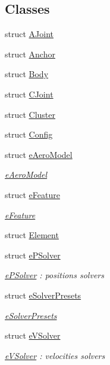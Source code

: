 \subsection*{Classes}
\begin{DoxyCompactItemize}
\item 
struct \hyperlink{structbtSoftBody_1_1AJoint}{A\+Joint}
\item 
struct \hyperlink{structbtSoftBody_1_1Anchor}{Anchor}
\item 
struct \hyperlink{structbtSoftBody_1_1Body}{Body}
\item 
struct \hyperlink{structbtSoftBody_1_1CJoint}{C\+Joint}
\item 
struct \hyperlink{structbtSoftBody_1_1Cluster}{Cluster}
\item 
struct \hyperlink{structbtSoftBody_1_1Config}{Config}
\item 
struct \hyperlink{structbtSoftBody_1_1eAeroModel}{e\+Aero\+Model}
\begin{DoxyCompactList}\small\item\em \hyperlink{structbtSoftBody_1_1eAeroModel}{e\+Aero\+Model} \end{DoxyCompactList}\item 
struct \hyperlink{structbtSoftBody_1_1eFeature}{e\+Feature}
\begin{DoxyCompactList}\small\item\em \hyperlink{structbtSoftBody_1_1eFeature}{e\+Feature} \end{DoxyCompactList}\item 
struct \hyperlink{structbtSoftBody_1_1Element}{Element}
\item 
struct \hyperlink{structbtSoftBody_1_1ePSolver}{e\+P\+Solver}
\begin{DoxyCompactList}\small\item\em \hyperlink{structbtSoftBody_1_1ePSolver}{e\+P\+Solver} \+: positions solvers \end{DoxyCompactList}\item 
struct \hyperlink{structbtSoftBody_1_1eSolverPresets}{e\+Solver\+Presets}
\begin{DoxyCompactList}\small\item\em \hyperlink{structbtSoftBody_1_1eSolverPresets}{e\+Solver\+Presets} \end{DoxyCompactList}\item 
struct \hyperlink{structbtSoftBody_1_1eVSolver}{e\+V\+Solver}
\begin{DoxyCompactList}\small\item\em \hyperlink{structbtSoftBody_1_1eVSolver}{e\+V\+Solver} \+: velocities solvers \end{DoxyCompactList}\item 

\end{DoxyCompactItemize}

